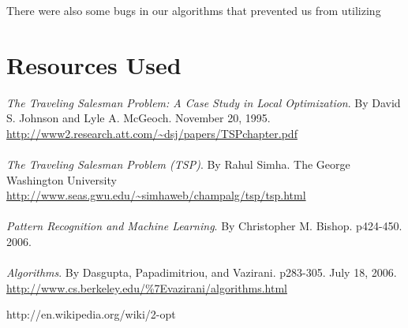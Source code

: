 \documentclass[12pt]{article}
\begin{document}
There were also some bugs in our algorithms that prevented us from utilizing 

\section*{Resources Used}

\emph{The Traveling Salesman Problem: A Case Study in Local Optimization}.  By
David S. Johnson and Lyle A. McGeoch. November 20, 1995.
\url{http://www2.research.att.com/~dsj/papers/TSPchapter.pdf}\\
\\

\emph{The Traveling Salesman Problem (TSP)}.  By Rahul Simha. The George
Washington University
\url{http://www.seas.gwu.edu/~simhaweb/champalg/tsp/tsp.html}\\
\\

\emph{Pattern Recognition and Machine Learning}. By Christopher M. Bishop.
p424-450. 2006.\\
\\

\emph{Algorithms}. By Dasgupta, Papadimitriou, and Vazirani. p283-305. July 18,
2006.  \url{http://www.cs.berkeley.edu/%7Evazirani/algorithms.html}

http://en.wikipedia.org/wiki/2-opt
\end{document}
